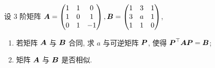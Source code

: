 \begin{example}
    设 3 阶矩阵 $\vb*{A}=\begin{pmatrix} 1 & 1 & 0 \\ 1 & 0 & 1 \\ 0 & 1 & -1 \\\end{pmatrix}, \vb*{B}=\begin{pmatrix} 1 & 3 & 1 \\ 3 & a & 1 \\ 1 & 1 & 0 \\\end{pmatrix}$,
    \begin{enumerate}[label=(\arabic{*})]
        \item 若矩阵 $\vb*{A}$ 与 $\vb*{B}$ 合同, 求 $a$ 与可逆矩阵 $\vb*{P}$, 使得 $\vb*{P}^\top\vb*{AP}=\vb*{B}$;
        \item 矩阵 $\vb*{A}$ 与 $\vb*{B}$ 是否相似.
    \end{enumerate}
\end{example}
